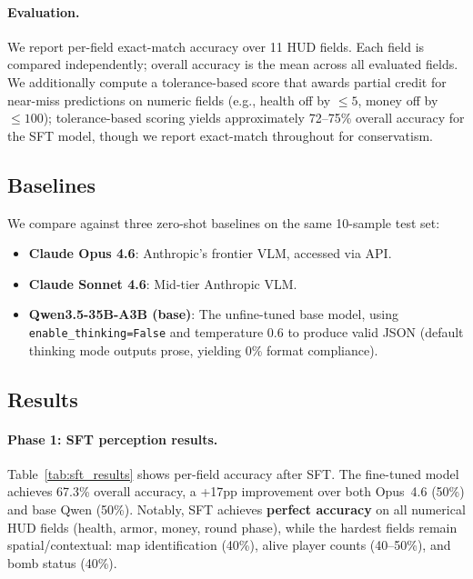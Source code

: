 \documentclass{article}
\begin{document}
\paragraph{Evaluation.} We report per-field exact-match accuracy over 11 HUD fields. Each field is compared independently; overall accuracy is the mean across all evaluated fields. We additionally compute a tolerance-based score that awards partial credit for near-miss predictions on numeric fields (e.g., health off by $\leq5$, money off by $\leq100$); tolerance-based scoring yields approximately 72--75\% overall accuracy for the SFT model, though we report exact-match throughout for conservatism.

\subsection{Baselines}
\label{sec:baselines}

We compare against three zero-shot baselines on the same 10-sample test set:
\begin{itemize}
    \item \textbf{Claude Opus 4.6}: Anthropic's frontier VLM, accessed via API.
    \item \textbf{Claude Sonnet 4.6}: Mid-tier Anthropic VLM.
    \item \textbf{Qwen3.5-35B-A3B (base)}: The unfine-tuned base model, using \texttt{enable\_thinking=False} and temperature 0.6 to produce valid JSON (default thinking mode outputs prose, yielding 0\% format compliance).
\end{itemize}


\subsection{Results}
\label{sec:results}

\paragraph{Phase 1: SFT perception results.} Table~\ref{tab:sft_results} shows per-field accuracy after SFT. The fine-tuned model achieves 67.3\% overall accuracy, a +17pp improvement over both Opus~4.6 (50\%) and base Qwen (50\%). Notably, SFT achieves \textbf{perfect accuracy} on all numerical HUD fields (health, armor, money, round phase), while the hardest fields remain spatial/contextual: map identification (40\%), alive player counts (40--50\%), and bomb status (40\%).
\end{document}
